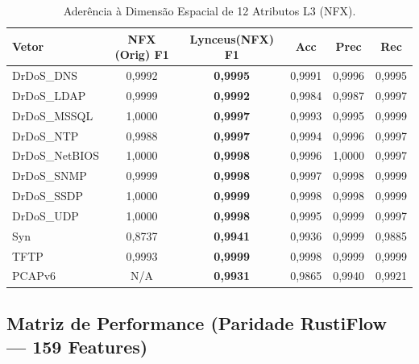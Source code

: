 \documentclass[11pt,a4paper]{article}
\begin{document}
\begin{table}[H]
\centering
\begin{tabular}{l|c|cccc}
\toprule
\textbf{Vetor} & \textbf{NFX (Orig) F1} & \textbf{Lynceus(NFX) F1} & \textbf{Acc} & \textbf{Prec} & \textbf{Rec} \\
\midrule
DrDoS\_DNS & 0,9992 & \textbf{0,9995} & 0,9991 & 0,9996 & 0,9995 \\
DrDoS\_LDAP & 0,9999 & \textbf{0,9992} & 0,9984 & 0,9987 & 0,9997 \\
DrDoS\_MSSQL & 1,0000 & \textbf{0,9997} & 0,9993 & 0,9995 & 0,9999 \\
DrDoS\_NTP & 0,9988 & \textbf{0,9997} & 0,9994 & 0,9996 & 0,9997 \\
DrDoS\_NetBIOS & 1,0000 & \textbf{0,9998} & 0,9996 & 1,0000 & 0,9997 \\
DrDoS\_SNMP & 0,9999 & \textbf{0,9998} & 0,9997 & 0,9998 & 0,9999 \\
DrDoS\_SSDP & 1,0000 & \textbf{0,9999} & 0,9998 & 0,9998 & 0,9999 \\
DrDoS\_UDP & 1,0000 & \textbf{0,9998} & 0,9995 & 0,9999 & 0,9997 \\
Syn & 0,8737 & \textbf{0,9941} & 0,9936 & 0,9999 & 0,9885 \\
TFTP & 0,9993 & \textbf{0,9999} & 0,9998 & 0,9999 & 0,9999 \\
PCAPv6 & N/A & \textbf{0,9931} & 0,9865 & 0,9940 & 0,9921 \\
\bottomrule
\end{tabular}
\caption{Aderência à Dimensão Espacial de 12 Atributos L3 (NFX).}
\end{table}

\subsection{Matriz de Performance (Paridade RustiFlow — 159 Features)}
\end{document}
